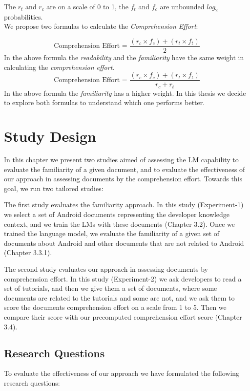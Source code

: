 \documentclass[12pt,mscthesis]{usiinfthesis}
\begin{document}
 The $r_{t}$  and $r_{c}$ are on a scale of 0 to 1,  the $f_{t}$  and $f_{c}$ are unbounded $log_{2}$ probabilities.\\
 We propose two formulas to calculate the \emph{Comprehension Effort}:

 \[\text{Comprehension Effort = }\frac{(r_{c}\times f_{c}) + (r_{t} \times f_{t})}{2} \]
 In the above formula the \emph{readability} and the \emph{familiarity} have the same weight in calculating the \emph{comprehension effort}.
 \[\text{Comprehension Effort = }\frac{(r_{c}\times f_{c}) + (r_{t} \times f_{t})}{r_c+r_t} \]
 In the above formula the \emph{familiarity} has a higher weight. In this thesis we decide to explore both formulas to understand which one performs better.
	
\chapter{Study Design}

	In this chapter we present two studies aimed of assessing the LM capability to evaluate the familiarity of a given document, and to evaluate the effectiveness of our approach in assessing documents by the comprehension effort. Towards this goal, we run two tailored studies:
	

	The first study evaluates the familiarity approach. In this study (Experiment-1) we select a set of Android documents representing the developer knowledge context, and we train the LMs with these documents (Chapter 3.2). Once we trained the language model, we evaluate the familiarity of a given set of documents about Android and other documents that are not related to Android (Chapter 3.3.1). 
		

	 The second study evaluates our approach in assessing documents by comprehension effort. In this study (Experiment-2) we ask developers to read a set of tutorials, and then we give them a set of documents, where some documents are related to the tutorials and some are not, and we ask them to score the documents comprehension effort on a scale from 1 to 5. Then we compare their score with our precomputed comprehension effort score (Chapter 3.4).


	\section{Research Questions}
	To evaluate the effectiveness of our approach we have formulated the following research questions:
	\newpage
\end{document}
